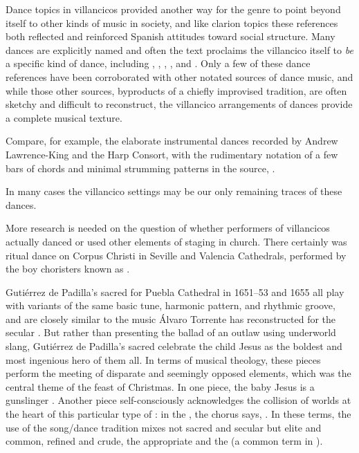 Dance topics in villancicos provided another way for the genre to point beyond
itself to other kinds of music in society, and like clarion topics these
references both reflected and reinforced Spanish attitudes toward social
structure.
Many dances are explicitly named and often the text proclaims the villancico
itself to \emph{be} a specific kind of dance, including ,
, , , and
.%
    \citXXX[sources]
Only a few of these dance references have been corroborated with other notated
sources of dance music, and while those other sources, byproducts of a chiefly
improvised tradition, are often sketchy and difficult to reconstruct, the
villancico arrangements of dances provide a complete musical texture.%
\begin{Footnote}
    Compare, for example, the elaborate instrumental dances recorded by Andrew
    Lawrence-King and the Harp Consort, 
    with the rudimentary notation of a few bars of chords and minimal strumming
    patterns in the source, .
\end{Footnote}
In many cases the villancico settings may be our only remaining traces of these
dances.%
\begin{Footnote}
    More research is needed on the question of whether performers of
    villancicos actually danced or used other elements of staging in church.
    There certainly was ritual dance on Corpus Christi in Seville and Valencia
    Cathedrals, performed by the boy choristers known as .%
        \Autocite{Comes:Danzas}
\end{Footnote}
	
Gutiérrez de Padilla's sacred  for Puebla Cathedral in 1651--53
and 1655 all play with variants of the same basic tune, harmonic pattern, and
rhythmic groove, and are closely similar to the music Álvaro Torrente has
reconstructed for the secular .%
But rather than presenting the ballad of an outlaw using underworld slang,
Gutiérrez de Padilla's sacred  celebrate the child Jesus as the
boldest and most ingenious hero of them all.
In terms of musical theology, these pieces perform the meeting of disparate and
seemingly opposed elements, which was the central theme of the feast of
Christmas.
In one piece, the baby Jesus is a gunslinger .
Another piece self-consciously acknowledges the collision of worlds at the
heart of this particular type of : in the
, the chorus says, .%
    \citXXX[sources]
In these terms, the use of the song/dance tradition mixes not sacred and
secular but elite and common, refined and crude, the appropriate and the
 (a common term in ).

